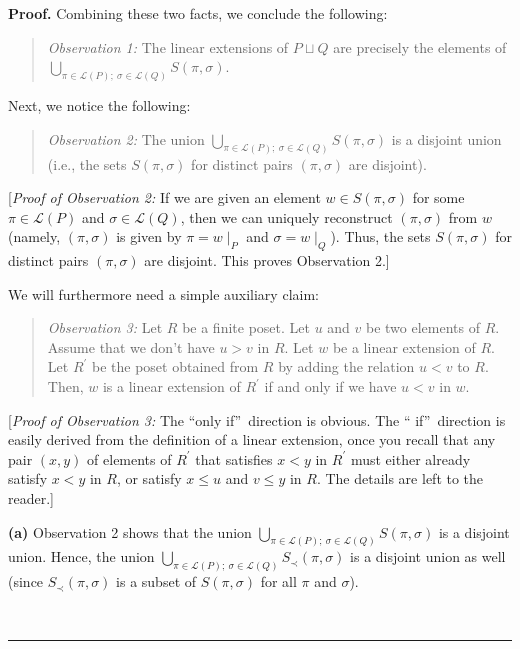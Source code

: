 \documentclass[numbers=enddot,12pt,final,onecolumn,notitlepage]{scrartcl}%
\theoremstyle{definition}
\newenvironment{statement}{\begin{quote}}{\end{quote}}
\newenvironment{proof}[1][Proof]{\noindent\textbf{#1.} }{\ \rule{0.5em}{0.5em}}
\newenvironment{verlong}{}{}
\begin{document}
\begin{verlong}
\begin{proof}
Combining these two facts, we conclude the following:

\begin{statement}
\textit{Observation 1:} The linear extensions of $P\sqcup Q$ are precisely the
elements of $\bigcup_{\pi\in\mathcal{L}\left(  P\right)  ;\ \sigma
\in\mathcal{L}\left(  Q\right)  }S\left(  \pi,\sigma\right)  $.
\end{statement}

Next, we notice the following:

\begin{statement}
\textit{Observation 2:} The union $\bigcup_{\pi\in\mathcal{L}\left(  P\right)
;\ \sigma\in\mathcal{L}\left(  Q\right)  }S\left(  \pi,\sigma\right)  $ is a
disjoint union (i.e., the sets $S\left(  \pi,\sigma\right)  $ for distinct
pairs $\left(  \pi,\sigma\right)  $ are disjoint).
\end{statement}

[\textit{Proof of Observation 2:} If we are given an element $w\in S\left(
\pi,\sigma\right)  $ for some $\pi\in\mathcal{L}\left(  P\right)  $ and
$\sigma\in\mathcal{L}\left(  Q\right)  $, then we can uniquely reconstruct
$\left(  \pi,\sigma\right)  $ from $w$ (namely, $\left(  \pi,\sigma\right)  $
is given by $\pi=w\mid_{P}$ and $\sigma=w\mid_{Q}$). Thus, the sets
$S\left(  \pi,\sigma\right)  $ for distinct pairs $\left(  \pi,\sigma\right)
$ are disjoint. This proves Observation 2.]

We will furthermore need a simple auxiliary claim:

\begin{statement}
\textit{Observation 3:} Let $R$ be a finite poset. Let $u$ and $v$ be two
elements of $R$. Assume that we don't have $u>v$ in $R$. Let $w$ be a linear
extension of $R$. Let $R^{\prime}$ be the poset obtained from $R$ by adding
the relation $u<v$ to $R$. Then, $w$ is a linear extension of $R^{\prime}$ if
and only if we have $u<v$ in $w$.
\end{statement}

[\textit{Proof of Observation 3:} The \textquotedblleft only
if\textquotedblright\ direction is obvious. The \textquotedblleft
if\textquotedblright\ direction is easily derived from the definition of a
linear extension, once you recall that any pair $\left(  x,y\right)  $ of
elements of $R^{\prime}$ that satisfies $x<y$ in $R^{\prime}$ must either
already satisfy $x<y$ in $R$, or satisfy $x\leq u$ and $v\leq y$ in $R$. The
details are left to the reader.]

\textbf{(a)} Observation 2 shows that the union $\bigcup_{\pi\in
\mathcal{L}\left(  P\right)  ;\ \sigma\in\mathcal{L}\left(  Q\right)
}S\left(  \pi,\sigma\right)  $ is a disjoint union. Hence, the union
$\bigcup_{\pi\in\mathcal{L}\left(  P\right)  ;\ \sigma\in\mathcal{L}\left(
Q\right)  }S_{\prec}\left(  \pi,\sigma\right)  $ is a disjoint union as well
(since $S_{\prec}\left(  \pi,\sigma\right)  $ is a subset of $S\left(
\pi,\sigma\right)  $ for all $\pi$ and $\sigma$).


\end{proof}
\end{verlong}
\end{document}
